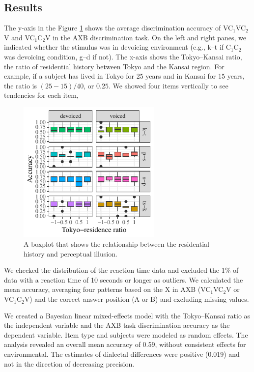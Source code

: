 \documentclass[a4paper,11pt,twocolumn]{article}
\begin{document}
\subsection{Results}

The y-axis in the Figure \ref{fig:axb_results} shows the average discrimination accuracy of VC$_\text{1}$VC$_\text{2}$V and VC$_\text{1}$C$_\text{2}$V in the AXB discrimination task. On the left and right panes, we indicated whether the stimulus was in devoicing environment (e.g., k--t if C$_\text{1}$C$_\text{2}$ was devoicing condition, g--d if not). The x-axis shows the Tokyo--Kansai ratio, the ratio of residential history between Tokyo and the Kansai region. For example, if a subject has lived in Tokyo for 25 years and in Kansai for 15 years, the ratio is $(25-15)/40$, or $0.25$. We showed four items vertically to see tendencies for each item,

\begin{figure}[!ht]
\begin{center}
\includegraphics[width=7cm]{../results/artifact/results_axb_allophone.pdf}
\caption{A boxplot that shows the relationship between the residential history and perceptual illusion.}\label{fig:axb_results}
\end{center}
\end{figure}

We checked the distribution of the reaction time data and excluded the 1\% of data with a reaction time of 10 seconds or longer as outliers. We calculated the mean accuracy, averaging four patterns based on the X in AXB (VC$_\text{1}$VC$_\text{2}$V or VC$_\text{1}$C$_\text{2}$V) and the correct answer position (A or B) and excluding missing values.

We created a Bayesian linear mixed-effects model \cite{lme4, rstanarm, easystats} with the Tokyo--Kansai ratio as the independent variable and the AXB task discrimination accuracy as the dependent variable. Item type and subjects were modeled as random effects. The analysis revealed an overall mean accuracy of 0.59, without consistent effects for environmental. The estimates of dialectal differences were positive (0.019) and not in the direction of decreasing precision.
\end{document}
